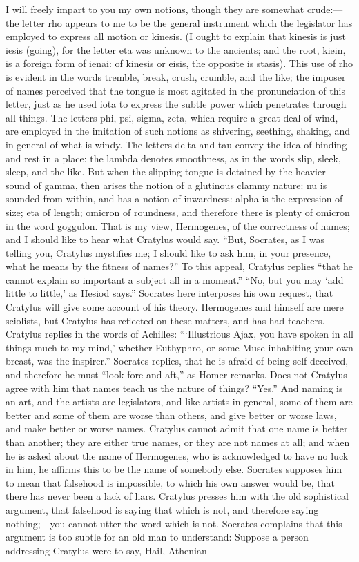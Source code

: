 \documentclass[11pt,letter]{article}
\begin{document}
\par  I will freely impart to you my own notions, though they are somewhat crude:—the letter rho appears to me to be the general instrument which the legislator has employed to express all motion or kinesis. (I ought to explain that kinesis is just iesis (going), for the letter eta was unknown to the ancients; and the root, kiein, is a foreign form of ienai: of kinesis or eisis, the opposite is stasis). This use of rho is evident in the words tremble, break, crush, crumble, and the like; the imposer of names perceived that the tongue is most agitated in the pronunciation of this letter, just as he used iota to express the subtle power which penetrates through all things. The letters phi, psi, sigma, zeta, which require a great deal of wind, are employed in the imitation of such notions as shivering, seething, shaking, and in general of what is windy. The letters delta and tau convey the idea of binding and rest in a place: the lambda denotes smoothness, as in the words slip, sleek, sleep, and the like. But when the slipping tongue is detained by the heavier sound of gamma, then arises the notion of a glutinous clammy nature: nu is sounded from within, and has a notion of inwardness: alpha is the expression of size; eta of length; omicron of roundness, and therefore there is plenty of omicron in the word goggulon. That is my view, Hermogenes, of the correctness of names; and I should like to hear what Cratylus would say. “But, Socrates, as I was telling you, Cratylus mystifies me; I should like to ask him, in your presence, what he means by the fitness of names?” To this appeal, Cratylus replies “that he cannot explain so important a subject all in a moment.” “No, but you may ‘add little to little,’ as Hesiod says.” Socrates here interposes his own request, that Cratylus will give some account of his theory. Hermogenes and himself are mere sciolists, but Cratylus has reflected on these matters, and has had teachers. Cratylus replies in the words of Achilles: “‘Illustrious Ajax, you have spoken in all things much to my mind,’ whether Euthyphro, or some Muse inhabiting your own breast, was the inspirer.” Socrates replies, that he is afraid of being self-deceived, and therefore he must “look fore and aft,” as Homer remarks. Does not Cratylus agree with him that names teach us the nature of things? “Yes.” And naming is an art, and the artists are legislators, and like artists in general, some of them are better and some of them are worse than others, and give better or worse laws, and make better or worse names. Cratylus cannot admit that one name is better than another; they are either true names, or they are not names at all; and when he is asked about the name of Hermogenes, who is acknowledged to have no luck in him, he affirms this to be the name of somebody else. Socrates supposes him to mean that falsehood is impossible, to which his own answer would be, that there has never been a lack of liars. Cratylus presses him with the old sophistical argument, that falsehood is saying that which is not, and therefore saying nothing;—you cannot utter the word which is not. Socrates complains that this argument is too subtle for an old man to understand: Suppose a person addressing Cratylus were to say, Hail, Athenian 
\end{document}
